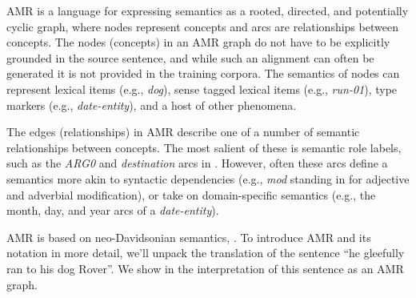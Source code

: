 \documentclass[11pt]{article}
\newcommand\w[1]{\textit{#1}} %
\begin{document}



AMR is a language for expressing semantics as a rooted, directed, and potentially cyclic graph, where nodes represent concepts and arcs are relationships between concepts.
The nodes (concepts) in an AMR graph do not have to be explicitly grounded in the source sentence, and while such an alignment can often be generated it is not provided in the training corpora.
The semantics of nodes can represent lexical items (e.g., \w{dog}), sense tagged lexical items (e.g., \textit{run-01}), type markers (e.g., \textit{date-entity}), and a host of other phenomena.

The edges (relationships) in AMR describe one of a number of semantic relationships between concepts.
The most salient of these is semantic role labels, such as the \w{ARG0} and \w{destination} arcs in .
However, often these arcs define a semantics more akin to syntactic dependencies (e.g., \textit{mod} standing in for adjective and adverbial modification), or take on domain-specific semantics (e.g., the month, day, and year arcs of a \textit{date-entity}).

AMR is based on neo-Davidsonian semantics, \cite{Davidson:1967,Parsons:1990}.
To introduce AMR and its notation in more detail, we'll unpack the translation of the sentence ``he gleefully ran to his dog Rover''. 
We show in  the interpretation of this sentence as an AMR graph.

\end{document}
